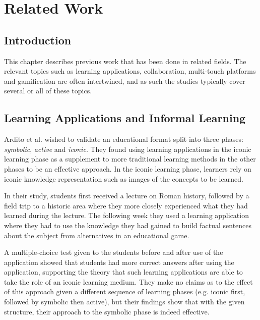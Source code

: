 
\chapter{Related Work}

\label{Chapter2}



\section{Introduction}

This chapter describes previous work that has been done in related fields. The relevant topics such as learning applications, collaboration, multi-touch platforms and gamification are often intertwined, and as such the studies typically cover several or all of these topics.


\section{Learning Applications and Informal Learning}

Ardito et al.\citep{Ardito} wished to validate an educational format split into three phases: \emph{symbolic}, \emph{active} and \emph{iconic}. They found using learning applications in the iconic learning phase as a supplement to more traditional learning methods in the other phases to be an effective approach. In the iconic learning phase, learners rely on iconic knowledge representation such as images of the concepts to be learned.

In their study, students first received a lecture on Roman history, followed by a field trip to a historic area where they more closely experienced what they had learned during the lecture. The following week they used a learning application where they had to use the knowledge they had gained to build factual sentences about the subject from alternatives in an educational game.

A multiple-choice test given to the students before and after use of the application showed that students had more correct answers after using the application, supporting the theory that such learning applications are able to take the role of an iconic learning medium. They make no claims as to the effect of this approach given a different sequence of learning phases (e.g. iconic first, followed by symbolic then active), but their findings show that with the given structure, their approach to the symbolic phase is indeed effective.


